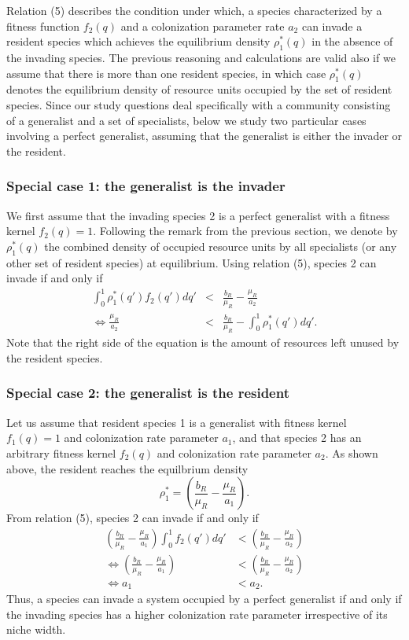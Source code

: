\documentclass[8pt,a4paper]{article}
\begin{document}
Relation (5) describes the condition under which, a species characterized by a fitness function $f_2(q)$ and a colonization parameter rate $a_2$ can invade a resident species which achieves the equilibrium density $\rho_1^*(q)$ in the absence of the invading species. The previous reasoning and calculations are valid also if we assume that there is more than one resident species, in which case $\rho_1^*(q)$ denotes the equilibrium density of resource units occupied by the set of resident species. Since our study questions deal specifically with a community consisting of a generalist and a set of specialists, below we study two particular cases involving a perfect generalist, assuming that the generalist is either the invader or the resident.

\subsubsection{Special case 1: the generalist is the invader}

We first assume that the invading species 2 is a perfect generalist with a fitness kernel $ f_2(q)=1.$  Following the remark from the previous section, we denote by $\rho_1^*(q)$ the combined density of occupied resource units by all specialists (or any other set of resident species) at equilibrium. Using relation (5), species 2 can invade if and only if
\begin{eqnarray}
  \int_0^1 \rho_1^*(q') f_2(q') dq' & < & \frac{b_R}{\mu_R} -\frac{\mu_R}{a_2} \nonumber\\
 \Leftrightarrow  \frac{\mu_R}{a_2} & < & \frac{b_R}{\mu_R} -  \int_0^1 \rho_1^*(q') dq'.
\end{eqnarray}
Note that the right side of the equation is the amount of resources left unused by the resident species.

\subsubsection{Special case 2: the generalist is the resident}

Let us assume that resident species 1 is a generalist with fitness kernel $ f_1(q)=1$ and colonization rate parameter $a_1$, and that species 2 has an arbitrary fitness kernel $f_2(q)$ and colonization rate parameter $a_2$. As shown above, the resident reaches the equilbrium density
 $$\rho_1^* = \left(\frac{b_R}{\mu_R}- \frac{\mu_R}{a_1} \right).$$ 
From relation (5), species 2 can invade if and only if
\begin{align}
 \left( \frac{b_R}{\mu_R}- \frac{\mu_R}{a_1} \right) \int_0^1 f_2(q') dq' &<   \left(  \frac{b_R}{\mu_R} -\frac{\mu_R}{a_2} \right) \nonumber\\
 \Leftrightarrow \left( \frac{b_R}{\mu_R}- \frac{\mu_R}{a_1} \right) &< \left( \frac{b_R}{\mu_R} -\frac{\mu_R}{a_2} \right) \nonumber\\
 \Leftrightarrow   a_1 &< a_2.
\end{align} 
Thus, a species can invade a system occupied by a perfect generalist if and only if the invading species has a higher colonization rate parameter irrespective of its niche width.
\end{document}
